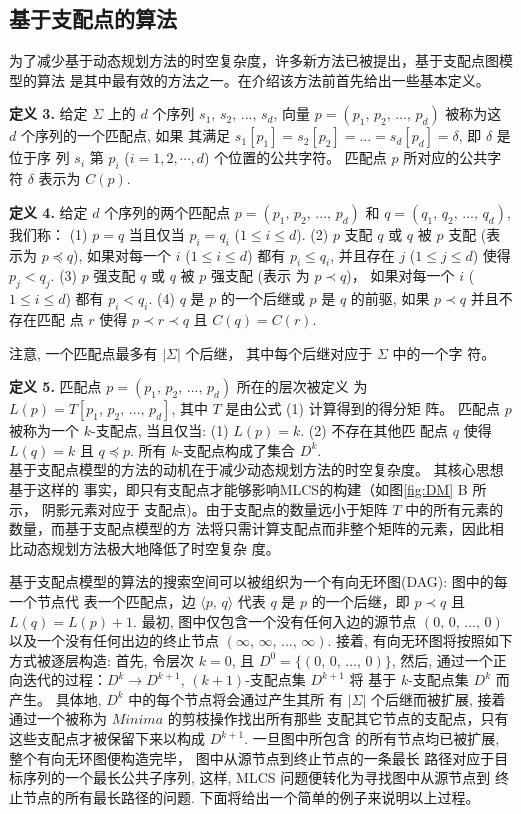 \documentclass[utf8]{frontiersSCNS} %
\begin{document}
\subsection{基于支配点的算法}
\label{sec:Dominant Point}

为了减少基于动态规划方法的时空复杂度，许多新方法已被提出，基于支配点图模型的算法
是其中最有效的方法之一。在介绍该方法前首先给出一些基本定义。

\textbf{定义 3.} 给定 $\Sigma$ 上的 $d$ 个序列 $s_1,\, s_2,\, ...,\,
s_d$, 向量 $p = (p_1,\, p_2,\, ...,\, p_d)$ 被称为这 $d$ 个序列的一个匹配点, 如果
其满足 $s_1[p_1] = s_2[p_2] = ... = s_d[p_d] = \delta$, 即 $\delta$ 是位于序
列 $s_i$ 第 $p_i$ ($i=1,2,\cdots,d$) 个位置的公共字符。 匹配点 $p$ 所对应的公共字
符 $\delta$ 表示为 $C(p)$.

\textbf{定义 4.} 给定 $d$ 个序列的两个匹配点 $p = (p_1,\, p_2,\, ...,\,
p_d)$ 和 $q = (q_1,\, q_2,\, ...,\, q_d)$, 我们称： (1) $p = q$ 当且仅当 $p_i =
q_i$ ($1 \leq i \leq d$). (2) $p$ 支配 $q$ 或 $q$ 被 $p$ 支配 (表示为 $p \preceq
q$), 如果对每一个 $i$ ($1 \leq i \leq d$) 都有 $p_i \leq q_i$, 并且存在 $j$
($1 \leq j \leq d$) 使得 $p_j<q_j$. (3) $p$ 强支配 $q$ 或 $q$ 被 $p$ 强支配 (表示
为 $p \prec q$)， 如果对每一个 $i$ ($1 \leq i \leq d$) 都有 $p_i < q_i$. (4) $q$
是 $p$ 的一个后继或 $p$ 是 $q$ 的前驱, 如果 $p \prec q$ 并且不存在匹配
点 $r$ 使得 $p \prec r \prec q$ 且 $C(q) = C(r)$.

注意, 一个匹配点最多有 $|\Sigma|$ 个后继， 其中每个后继对应于 $\Sigma$ 中的一个字
符。

\textbf{定义 5.} 匹配点 $p = (p_1,\, p_2,\, ...,\, p_d)$ 所在的层次被定义
为 $L(p) = T[p_1,\, p_2,\, ...,\, p_d]$, 其中 $T$ 是由公式 (1) 计算得到的得分矩
阵。 匹配点 $p$ 被称为一个 $k$-支配点, 当且仅当: (1) $L(p) = k$. (2) 不存在其他匹
配点 $q$ 使得 $L(q) = k$ 且 $q \preceq p$. 所有 $k$-支配点构成了集合 $D^k$.\\

基于支配点模型的方法的动机在于减少动态规划方法的时空复杂度。 其核心思想基于这样的
事实，即只有支配点才能够影响MLCS的构建（如图\ref{fig:DM} B 所示， 阴影元素对应于
支配点)。由于支配点的数量远小于矩阵 $T$ 中的所有元素的数量，而基于支配点模型的方
法将只需计算支配点而非整个矩阵的元素，因此相比动态规划方法极大地降低了时空复杂
度。

基于支配点模型的算法的搜索空间可以被组织为一个有向无环图(DAG): 图中的每一个节点代
表一个匹配点，边 $\langle p,\, q \rangle$ 代表 $q$ 是 $p$ 的一个后继，即 $p
\prec q$ 且 $L(q) = L(p) + 1$. 最初, 图中仅包含一个没有任何入边的源节点 $(0,\,
0,\, ...,\, 0)$ 以及一个没有任何出边的终止节点 $(\infty,\, \infty,\, ...,\,
\infty)$. 接着, 有向无环图将按照如下方式被逐层构造: 首先, 令层次 $k =
0$, 且 $D^0 = \{(0,\, 0,\, ...,\, 0)\}$, 然后,
通过一个正向迭代的过程：$D^k \rightarrow D^{k+1}$, $(k+1)$-支配点集 $D^{k+1}$ 将
基于 $k$-支配点集 $D^k$ 而产生。 具体地, $D^k$ 中的每个节点将会通过产生其所
有 $|\Sigma|$ 个后继而被扩展, 接着通过一个被称为 $Minima$ 的剪枝操作找出所有那些
支配其它节点的支配点，只有这些支配点才被保留下来以构成 $D^{k+1}$. 一旦图中所包含
的所有节点均已被扩展, 整个有向无环图便构造完毕， 图中从源节点到终止节点的一条最长
路径对应于目标序列的一个最长公共子序列, 这样, MLCS 问题便转化为寻找图中从源节点到
终止节点的所有最长路径的问题. 下面将给出一个简单的例子来说明以上过程。
\end{document}
